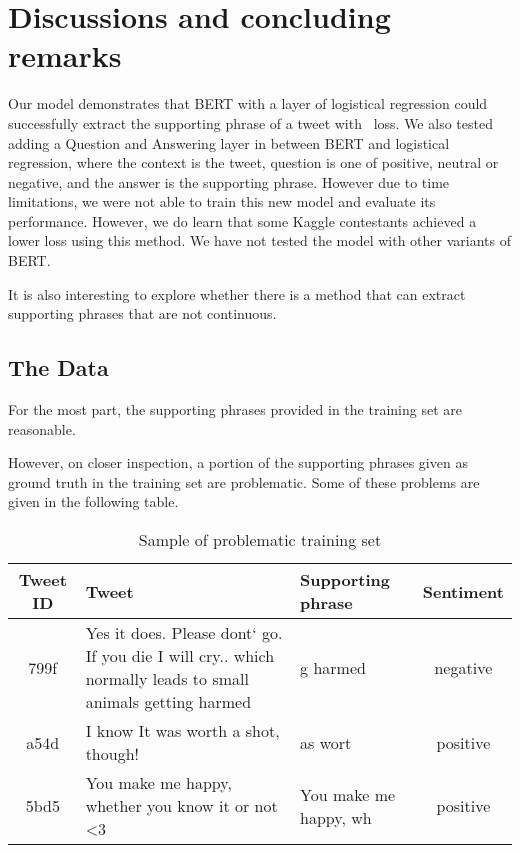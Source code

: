 \section{Discussions and concluding remarks} \label{sec:discussion}

Our model demonstrates that BERT with a layer of logistical regression could successfully extract the supporting phrase of a tweet with \score\ loss. We also tested adding a Question and Answering layer in between BERT and logistical regression, where the context is the tweet, question is one of positive, neutral or negative, and the answer is  the supporting phrase. However due to time limitations, we were not able to train this new model and evaluate its performance. However, we do learn that some Kaggle contestants achieved a lower loss using this method. We have not tested the model with other variants of BERT. 

It is also interesting to explore whether there is a method that can
extract supporting phrases that are not continuous.

\subsection{The Data}
For the most part, the supporting phrases provided in the training set are reasonable.  

However, on closer inspection, a portion of the supporting phrases given as ground
truth in the training set are problematic.  Some of these problems are
given in the following table.

\begin{table}[!h]
	\centering
	\begin{tabular} {c | p{5cm} l c}
	Tweet ID & Tweet & Supporting phrase & Sentiment \\
	\hline
          799f &  Yes it does. Please dont` go. If you die I will
                 cry.. which normally leads to small animals getting
                 harmed & g harmed & negative \\
          \hline
          a54d & I know   It was worth a shot, though! & as wort &
                                                                   positive \\
          \hline
	5bd5 & You make me happy, whether you know it or not  <3 & You make me happy, wh & positive
	\end{tabular}
	\caption{Sample of problematic training set}
\end{table} 

